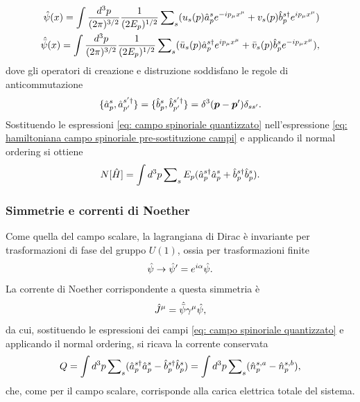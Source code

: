 \begin{align}
\label{eq: campo spinoriale quantizzato}
    \hat{\psi}(x) = \int\frac{d^3p}{(2\pi)^{3/2}}\frac{1}{(2E_p)^{1/2}}\sum\nolimits_s(u_s(p)\hat{a}^s_p e^{-ip_\mu x^\mu} + v_s(p)\hat{b}_p^{s\dagger} e^{ip_\mu x^\mu}) \\
    \hat{\bar{\psi}}(x) = \int\frac{d^3p}{(2\pi)^{3/2}}\frac{1}{(2E_p)^{1/2}}\sum\nolimits_s(\bar{u}_s(p)\hat{a}^{s\dagger}_p e^{ip_\mu x^\mu} + \bar{v}_s(p)\hat{b}_p^s e^{-ip_\mu x^\mu}),
\end{align}
dove gli operatori di creazione e distruzione soddisfano le regole di anticommutazione
\begin{equation}
    \{\hat{a}^s_p,\hat{a}^{s'\dagger}_{p'}\} = \{\hat{b}^s_p,\hat{b}^{s'\dagger}_{p'}\} = \delta^3(\bm{p} - \bm{p}')\delta_{ss'}.
\end{equation}
Sostituendo le espressioni \eqref{eq: campo spinoriale quantizzato} nell'espressione \eqref{eq: hamiltoniana campo spinoriale pre-sostituzione campi} e applicando il normal ordering si ottiene
\begin{equation}
\label{eq: hamiltoniana campo spinoriale}
    N[\hat{H}] = \int d^3p\sum\nolimits_s E_p(\hat{a}^{s\dagger}_p\hat{a}^s_p + \hat{b}^{s\dagger}_p\hat{b}^s_p).
\end{equation}

\subsubsection{Simmetrie e correnti di Noether}
Come quella del campo scalare, la lagrangiana di Dirac è invariante per trasformazioni di fase del gruppo $U(1)$, ossia per trasformazioni finite
\begin{equation}
    \hat{\psi}\to\hat{\psi}' = e^{i\alpha}\hat{\psi}.
\end{equation}
La corrente di Noether corrispondente a questa simmetria è
\begin{equation}
\label{eq: corrente di Noether campo spinoriale}
    \hat{J}^\mu = \hat{\bar{\psi}}\gamma^\mu\hat{\psi},
\end{equation}
da cui, sostituendo le espressioni dei campi \eqref{eq: campo spinoriale quantizzato} e applicando il normal ordering, si ricava la corrente conservata
\begin{equation}
\label{eq: carica conservata campo spinoriale}
    Q = \int d^3p\sum\nolimits_s(\hat{a}_p^{s\dagger}\hat{a}_p^s - \hat{b}_p^{s\dagger}\hat{b}_p^s) = \int d^3p\sum\nolimits_s (\hat{n}_p^{s,a} - \hat{n}^{s,b}_p),
\end{equation}
che, come per il campo scalare, corrisponde alla carica elettrica totale del sistema.

